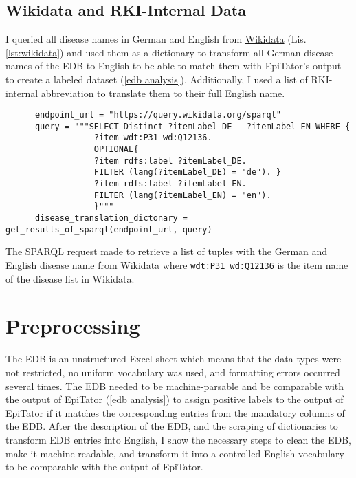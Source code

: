 \subsection{Wikidata and RKI-Internal Data}\label{wikidata}
  I queried all disease names in German and English from \href{https://www.wikidata.org/wiki/Wikidata:Main_Page}{Wikidata} (Lis. \ref{lst:wikidata}) and used them as a dictionary to transform all German disease names of the EDB to English to be able to match them with EpiTator's output to create a labeled dataset (\ref{edb analysis}).
  Additionally, I used a list of RKI-internal abbreviation to translate them to their full English name.

  \begin{listing}[h]
    \begin{verbatim}
      endpoint_url = "https://query.wikidata.org/sparql"
      query = """SELECT Distinct ?itemLabel_DE   ?itemLabel_EN WHERE {
                  ?item wdt:P31 wd:Q12136.
                  OPTIONAL{
                  ?item rdfs:label ?itemLabel_DE.
                  FILTER (lang(?itemLabel_DE) = "de"). }
                  ?item rdfs:label ?itemLabel_EN.
                  FILTER (lang(?itemLabel_EN) = "en").
                  }"""
      disease_translation_dictonary = get_results_of_sparql(endpoint_url, query)
    \end{verbatim}
    \caption{The SPARQL request made to retrieve a list of tuples with the German and English disease name from Wikidata where \texttt{wdt:P31 wd:Q12136} is the item name of the disease list in Wikidata.}
    \label{lst:wikidata}
  \end{listing}

\section{Preprocessing}
  The EDB is an unstructured Excel sheet which means that the data types were not restricted, no uniform vocabulary was used, and formatting errors occurred several times.
  The EDB needed to be machine-parsable and be comparable with the output of EpiTator (\ref{edb analysis}) to assign positive labels to the output of EpiTator if it matches the corresponding entries from the mandatory columns of the EDB.
  After the description of the EDB, and the scraping of dictionaries to transform EDB entries into English, I show the necessary steps to clean the EDB, make it machine-readable, and transform it into a controlled English vocabulary to be comparable with the output of EpiTator.

